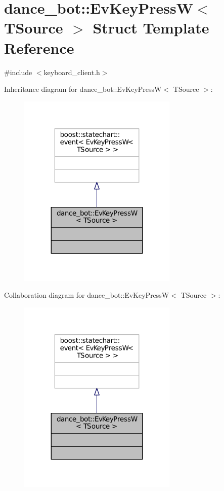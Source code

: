 \hypertarget{structdance__bot_1_1EvKeyPressW}{}\section{dance\+\_\+bot\+:\+:Ev\+Key\+PressW$<$ T\+Source $>$ Struct Template Reference}
\label{structdance__bot_1_1EvKeyPressW}


{\ttfamily \#include $<$keyboard\+\_\+client.\+h$>$}



Inheritance diagram for dance\+\_\+bot\+:\+:Ev\+Key\+PressW$<$ T\+Source $>$\+:
\nopagebreak
\begin{figure}[H]
\begin{center}
\leavevmode
\includegraphics[width=215pt]{structdance__bot_1_1EvKeyPressW__inherit__graph}
\end{center}
\end{figure}


Collaboration diagram for dance\+\_\+bot\+:\+:Ev\+Key\+PressW$<$ T\+Source $>$\+:
\nopagebreak
\begin{figure}[H]
\begin{center}
\leavevmode
\includegraphics[width=215pt]{structdance__bot_1_1EvKeyPressW__coll__graph}
\end{center}
\end{figure}


